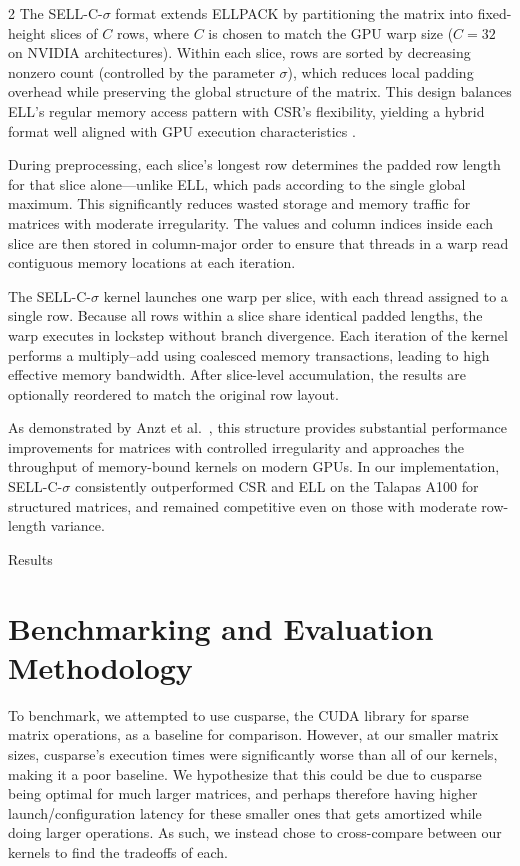 \documentclass{article}
\begin{document}
\begin{multicols}{2}
The SELL-C-$\sigma$ format extends ELLPACK by partitioning the matrix into 
fixed-height slices of $C$ rows, where $C$ is chosen to match the GPU warp size 
($C=32$ on NVIDIA architectures). Within each slice, rows are sorted by 
decreasing nonzero count (controlled by the parameter $\sigma$), which reduces 
local padding overhead while preserving the global structure of the matrix. 
This design balances ELL's regular memory access pattern with CSR’s flexibility, 
yielding a hybrid format well aligned with GPU execution characteristics 
\cite{SELLCSIGMA}.

During preprocessing, each slice's longest row determines the padded row length 
for that slice alone—unlike ELL, which pads according to the single global 
maximum. This significantly reduces wasted storage and memory traffic for 
matrices with moderate irregularity. The values and column indices inside each 
slice are then stored in column-major order to ensure that threads in a warp 
read contiguous memory locations at each iteration.

The SELL-C-$\sigma$ kernel launches one warp per slice, with each thread 
assigned to a single row. Because all rows within a slice share identical padded 
lengths, the warp executes in lockstep without branch divergence. Each 
iteration of the kernel performs a multiply–add using coalesced memory 
transactions, leading to high effective memory bandwidth. After slice-level 
accumulation, the results are optionally reordered to match the original row 
layout.

As demonstrated by Anzt et al.\ \cite{SELLCSIGMA}, this structure provides 
substantial performance improvements for matrices with controlled irregularity 
and approaches the throughput of memory-bound kernels on modern GPUs. In our 
implementation, SELL-C-$\sigma$ consistently outperformed CSR and ELL on the 
Talapas A100 for structured matrices, and remained competitive even on those 
with moderate row-length variance.

Results\section{Benchmarking and Evaluation Methodology}

To benchmark, we attempted to use cusparse, the CUDA library for sparse matrix operations, as a baseline for comparison. However, at our smaller matrix sizes, cusparse’s execution times were significantly worse than all of our kernels, making it a poor baseline. We hypothesize that this could be due to cusparse being optimal for much larger matrices, and perhaps therefore having higher launch/configuration latency for these smaller ones that gets amortized while doing larger operations. As such, we instead chose to cross-compare between our kernels to find the tradeoffs of each. 


\end{multicols}
\end{document}
